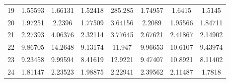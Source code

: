 \begin{center}
\begin{longtable}{cccccccc}
19 & 1.55593 & 1.66131 & 1.52418 & 285.285 & 1.74957 & 1.6415 & 1.5145\\
20 & 1.97251 & 2.2396 & 1.77509 & 3.64156 & 2.2089 & 1.95566 & 1.84711\\
21 & 2.27393 & 4.06376 & 2.32114 & 3.77645 & 2.67621 & 2.41867 & 2.14902\\
22 & 9.86705 & 14.2648 & 9.13174 & 11.947 & 9.96653 & 10.6107 & 9.43974\\
23 & 9.23458 & 9.99594 & 8.41619 & 12.9221 & 9.47407 & 10.8921 & 8.11402\\
24 & 1.81147 & 2.23523 & 1.98875 & 2.22941 & 2.39562 & 2.11487 & 1.7818\\
\end{longtable}
\end{center} 



